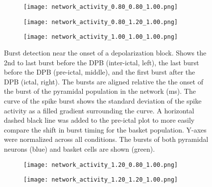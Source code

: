 \begin{figure}[!htb]
    \centering
    \begin{subfigure}{\textwidth}
        \texttt{[image: network\_activity\_0.80\_0.80\_1.00.png]}
        \caption{} %
    \end{subfigure}
    \vspace{1em} %

    \begin{subfigure}{\textwidth}
        \texttt{[image: network\_activity\_0.80\_1.20\_1.00.png]}
        \caption{} %
    \end{subfigure}
    \vspace{1em} %

    \begin{subfigure}{\textwidth}
        \texttt{[image: network\_activity\_1.00\_1.00\_1.00.png]}
        \caption{} %
    \end{subfigure}

    \caption[Burst detection near the onset of a depolarization block]{Burst detection near the onset of a depolarization block. Shows the 2nd to last burst before the DPB (inter-ictal, left),
        the last burst before the DPB (pre-ictal, middle), and the first burst after the DPB (ictal, right).
        The bursts are aligned relative the the onset of the burst of the pyramidal population in the network (ms).
        The curve of the spike burst shows the standard deviation of the spike activity as a filled gradient surrounding the curve.
        A horizontal dashed black line was added to the pre-ictal plot to more easily compare the shift in burst timing for the basket population.
        Y-axes were normalized across all conditions.
        The bursts of both pyramidal neurons (blue) and basket cells are shown (green).}\label{fig:burst_detection}
\end{figure}
\clearpage %

\begin{figure}[!htb] \ContinuedFloat%
    \centering
    \begin{subfigure}{\textwidth}
        \texttt{[image: network\_activity\_1.20\_0.80\_1.00.png]}
        \caption{} %
    \end{subfigure}
    \vspace{1em} %

    \begin{subfigure}{\textwidth}
        \texttt{[image: network\_activity\_1.20\_1.20\_1.00.png]}
        \caption{} %
    \end{subfigure}

\end{figure}
\pagebreak
